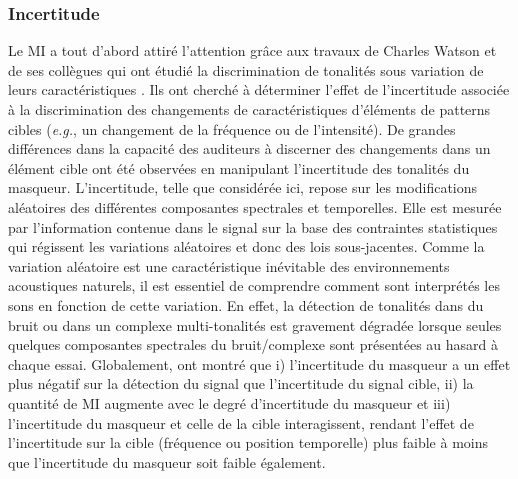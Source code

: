 \subsubsection{Incertitude}
\label{masquageinformationnelincertitude}

Le MI a tout d'abord attiré l'attention grâce aux travaux de Charles Watson et de ses collègues qui ont étudié la discrimination de tonalités sous variation de leurs caractéristiques \citep{watson1975factors, watson1976factors}. 
Ils ont cherché à déterminer l'effet de l'incertitude associée à la discrimination des changements de caractéristiques d'éléments de patterns cibles (\textit{e.g.}, un changement de la fréquence ou de l'intensité). 
De grandes différences dans la capacité des auditeurs à discerner des changements dans un élément cible ont été observées en manipulant l'incertitude des tonalités du masqueur. 
L'incertitude, telle que considérée ici, repose sur les modifications aléatoires des différentes composantes spectrales et temporelles. 
Elle est mesurée par l'information contenue dans le signal sur la base des contraintes statistiques qui régissent les variations aléatoires et donc des lois sous-jacentes. 
Comme la variation aléatoire est une caractéristique inévitable des environnements acoustiques naturels, il est essentiel de comprendre comment sont interprétés les sons en fonction de cette variation. 
En effet, la détection de tonalités dans du bruit ou dans un complexe multi-tonalités est gravement dégradée lorsque seules quelques composantes spectrales du bruit/complexe sont présentées au hasard à chaque essai. 
Globalement, \cite{watson1976factors} ont montré que i) l'incertitude du masqueur a un effet plus négatif sur la détection du signal que l'incertitude du signal cible, ii) la quantité de MI augmente avec le degré d'incertitude du masqueur et iii) l'incertitude du masqueur et celle de la cible interagissent, rendant l'effet de l'incertitude sur la cible (fréquence ou position temporelle) plus faible à moins que l'incertitude du masqueur soit faible également. 

